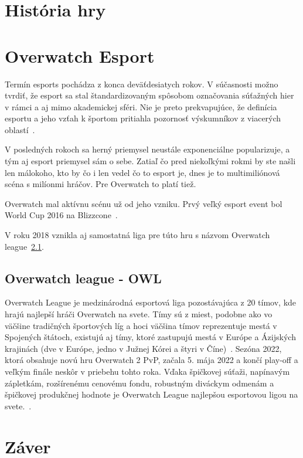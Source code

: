 \documentclass[10pt,oneside,slovak,a4paper]{article}
\begin{document}
\section{História hry} \label{História hry}


\section{Overwatch Esport} \label{Overwatch Esport}

Termín esports pochádza z konca deväťdesiatych rokov. V súčasnosti možno tvrdiť, že esport sa stal štandardizovaným spôsobom označovania súťažných hier v rámci a aj mimo akademickej sféri. Nie je preto prekvapujúce, že definícia esportu a jeho vzťah k športom pritiahla pozornosť výskumníkov z viacerých oblastí~\cite{Overwatchesport}.

V posledných rokoch sa herný priemysel neustále exponenciálne popularizuje, a tým aj esport priemysel sám o sebe. Zatiaľ čo pred niekoľkými rokmi by ste 
našli len málokoho, kto by čo i len vedel čo to esport je, dnes je to multimiliónová scéna s milíonmi hráčov. Pre Overwatch to platí tiež.

Overwatch mal aktívnu scénu už od jeho vzniku. Prvý veľký esport event bol World Cup 2016 na Blizzcone~\cite{Overwatchesport}.

V roku 2018 vznikla aj samostatná liga pre túto hru s názvom Overwatch league~\ref{Overwatch league - OWL}.

\subsection{Overwatch league - OWL} \label{Overwatch league - OWL}

Overwatch League je medzinárodná esportová liga pozostávajúca z 20 tímov, kde hrajú najlepší hráči Overwatch na svete. Tímy sú z miest, podobne ako vo väčšine tradičných športových líg a hoci väčšina tímov reprezentuje mestá v Spojených štátoch, existujú aj tímy, ktoré zastupujú mestá v Európe a Ázijských krajinách (dve v Európe, jedno v Južnej Kórei a štyri v Číne)~\cite{Overwatchesport}. Sezóna 2022, ktorá obsahuje novú hru Overwatch 2 PvP, začala 5. mája 2022 a končí play-off a veľkým finále neskôr v priebehu tohto roka. Vďaka špičkovej súťaži, napínavým zápletkám, rozšírenému cenovému fondu, robustným diváckym odmenám a špičkovej produkčnej hodnote je Overwatch League najlepšou esportovou ligou na svete.~\cite{Overwatchsite}.



\section{Záver} \label{zaver} %






\end{document}
